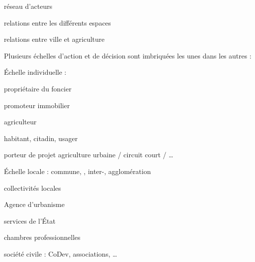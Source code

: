 \startplacefigure[location=middle,
short={Analyse de l'étalement urbain à travers le cadre IAD},
title={Analyse de l'étalement urbain à travers le cadre IAD.
       Adapté de \citet{ostrom_background_2011} }]
\stopplacefigure






\startitemize[packed]

\item réseau d'acteurs
\item relations entre les différents espaces
\item relations entre ville et agriculture

\stopitemize


Plusieurs échelles d'action et de décision
sont imbriquées les unes dans les autres :

\startcolumns[2]
\startitemize[a,packed]

\item Échelle individuelle :

	\startitemize[packed]
		\item propriétaire du foncier
		\item promoteur immobilier
		\item agriculteur
		\item habitant, citadin, usager
		\item porteur de projet agriculture urbaine / circuit court / \dots
	\stopitemize

\item Échelle locale : commune, \SCoT, inter-\SCoT, agglomération

	\startitemize[packed]

		\item collectivités locales
		\item Agence d'urbanisme
		\item services de l'État
		\item chambres professionnelles
		\item société civile : CoDev, associations, \dots

